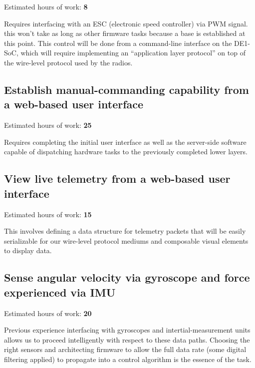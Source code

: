 \documentclass{article}
\begin{document}
Estimated hours of work: \textbf{8}
\vspace{0.25cm}

\noindent
Requires interfacing with an ESC (electronic speed controller) via PWM signal.
this won't take as long as other firmware tasks because a base is established
at this point. This control will be done from a command-line interface on
the DE1-SoC, which will require implementing an ``application layer protocol''
on top of the wire-level protocol used by the radios.

\subsection{Establish manual-commanding capability from a web-based user interface}

Estimated hours of work: \textbf{25}
\vspace{0.25cm}

\noindent
Requires completing the initial user interface as well as the server-side
software capable of dispatching hardware tasks to the previously completed
lower layers.

\subsection{View live telemetry from a web-based user interface}

Estimated hours of work: \textbf{15}
\vspace{0.25cm}

\noindent
This involves defining a data structure for telemetry packets that will
be easily serializable for our wire-level protocol mediums and composable
visual elements to display data.

\subsection{Sense angular velocity via gyroscope and force experienced via IMU}

Estimated hours of work: \textbf{20}
\vspace{0.25cm}

\noindent
Previous experience interfacing with gyroscopes and intertial-measurement
units allows us to proceed intelligently with respect to these data paths.
Choosing the right sensors and architecting firmware to allow the full data
rate (some digital filtering applied) to propagate into a control algorithm
is the essence of the task.
\end{document}
